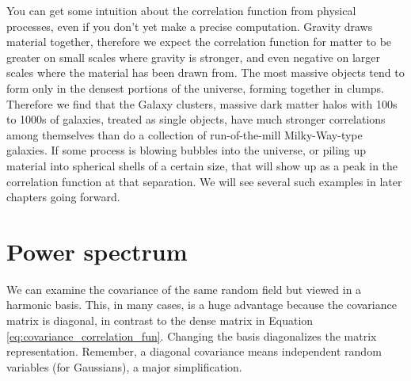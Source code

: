 You can get some intuition about the correlation function from physical processes, even if you don't yet make a precise computation.  Gravity draws material together, therefore we expect the correlation function for matter to be greater on small scales where gravity is stronger, and even negative on larger scales where the material has been drawn from.  The most massive objects tend to form only in the densest portions of the universe, forming together in clumps.  Therefore we find that the Galaxy clusters, massive dark matter halos with 100s to 1000s of galaxies, treated as single objects, have much stronger correlations among themselves than do a collection of run-of-the-mill Milky-Way-type galaxies.  If some process is blowing bubbles into the universe, or piling up material into spherical shells of a certain size, that will show up as a peak in the correlation function at that separation.  We will see several such examples in later chapters going forward.




\section{Power spectrum}
We can examine the covariance of the same random field but viewed in a harmonic basis.  This, in many cases, is a huge advantage because the covariance matrix is diagonal, in contrast to the dense matrix in Equation \ref{eq:covariance_correlation_fun}.  Changing the basis diagonalizes the matrix representation.  Remember, a diagonal covariance means independent random variables (for Gaussians), a major simplification.

